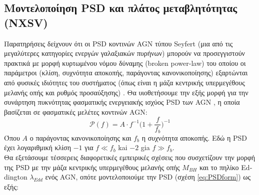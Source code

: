 
\subsection{Μοντελοποίηση \textlatin{PSD} και πλάτος μεταβλητότητας (\textlatin{NXSV})}

Παρατηρήσεις δείχνουν ότι οι \textlatin{PSD} κοντινών \textlatin{AGN} τύπου \textlatin{Seyfert} (μια από τις μεγαλύτερες κατηγορίες ενεργών γαλαξιακών πυρήνων) μπορούν να προσεγγιστούν πρακτικά με μορφή κυρτωμένου νόμου δύναμης \textlatin{(broken power-law)} του οποίου οι παράμετροι (κλίση, συχνότητα αποκοπής, παράγοντας κανονικοποίησης) εξαρτώνται από φυσικές ιδιότητες του συστήματος (όπως είναι η μάζα κεντρικής υπερμεγέθους μελανής οπής και ρυθμός προσαύξησης)\cite{2012A&A...542A..83P} \cite{VAR}. Θα υιοθετήσουμε την εξής μορφή για την συνάρτηση πυκνότητας φασματικής ενεργειακής ισχύος \textlatin{PSD} των \textlatin{AGN}\cite{2012A&A...544A..80G} \cite{2017MNRAS.471.4398P}, η οποία βασίζεται σε φασματικές μελέτες κοντινών \textlatin{AGN}:
 \begin{equation} \mathcal{P}(f) = A\cdot f^{-1} \big( 1+\dfrac{f}{f_b}   \big)^{-1} \label{eq:PSDform}\end{equation}
Όπου $Α$ ο παράγοντας κανονικοποίησης και $f_b$ η συχνότητα αποκοπής. Εδώ η \textlatin{PSD} έχει λογαριθμική κλίση $-1$ για $f\ll f_b$ kai $-2$ gia $f\gg f_b$.\\
 Θα εξετάσουμε τέσσερεις διαφορετικές εμπειρικές σχέσεις που συσχετίζουν την μορφή της \textlatin{PSD} με την μάζα κεντρικής υπερμεγέθους μελανής οπής $M_{BH}$ και το πηλίκο \textlatin{Eddington} $\lambda_{Edd}$ ενός \textlatin{AGN}, οπότε μοντελοποιούμε την \textlatin{PSD} (σχέση \ref{eq:PSDform}) ως εξής\cite{2017MNRAS.471.4398P}:

